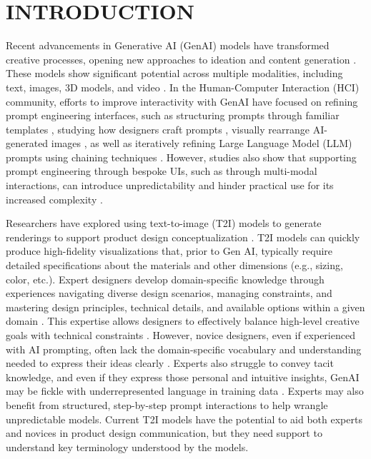 \section{INTRODUCTION}

Recent advancements in Generative AI (GenAI) models \cite{goodfellow2014generative, vaswani2017attention, radford2021learning, dhariwal2021diffusion} have transformed creative processes, opening new approaches to ideation and content generation \cite{davis2017quantifying, karimi2020creative}. These models show significant potential across multiple modalities, including text, images, 3D models, and video \cite{ramesh2021zero, poole2022dreamfusion, singer2022make}. In the Human-Computer Interaction (HCI) community, efforts to improve interactivity with GenAI have focused on refining prompt engineering interfaces, such as structuring prompts through familiar templates \cite{xu2024jamplate, wu2022ai, chung2023promptpaint}, studying how designers craft prompts \cite{chong2024cad, palani2024evolving}, visually rearrange AI-generated images \cite{zhang2023adding, brade2023promptify}, as well as iteratively refining Large Language Model (LLM) prompts using chaining techniques \cite{liu2022opal, di2022idea, wu2022promptchainer}. However, studies also show that supporting prompt engineering through bespoke UIs, such as through multi-modal interactions, can introduce unpredictability and hinder practical use for its increased complexity \cite{peng2024designprompt}.

Researchers have explored using text-to-image (T2I) models to generate renderings to support product design conceptualization \cite{jeon2021fashionq, liu20233dall}. T2I models can quickly produce high-fidelity visualizations that, prior to Gen AI, typically require detailed specifications about the materials and other dimensions (e.g., sizing, color, etc.). Expert designers develop domain-specific knowledge through experiences navigating diverse design scenarios, managing constraints, and mastering design principles, technical details, and available options within a given domain \cite{chong2024cad, tollestrup2023design, lawson2013design, mckenna2014adaptive}. This expertise allows designers to effectively balance high-level creative goals with technical constraints \cite{winston1970learning}. However, novice designers, even if experienced with AI prompting, often lack the domain-specific vocabulary and understanding needed to express their ideas clearly \cite{palani2021conotate, zamfirescu2023johnny}. Experts also struggle to convey tacit knowledge, and even if they express those personal and intuitive insights, GenAI may be fickle with underrepresented language in training data \cite{liu2023wants}. Experts may also benefit from structured, step-by-step prompt interactions to help wrangle unpredictable models. Current T2I models have the potential to aid both experts and novices in product design communication, but they need support to understand key terminology understood by the models. 


